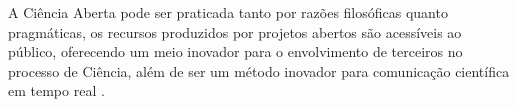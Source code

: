 A Ciência Aberta pode ser praticada tanto por razões filosóficas quanto
pragmáticas, os recursos produzidos por projetos abertos são acessíveis ao
público, oferecendo um meio inovador para o envolvimento de terceiros no
processo de Ciência, além de ser um método inovador para comunicação científica
em tempo real \cite{grand_open_2010}.
